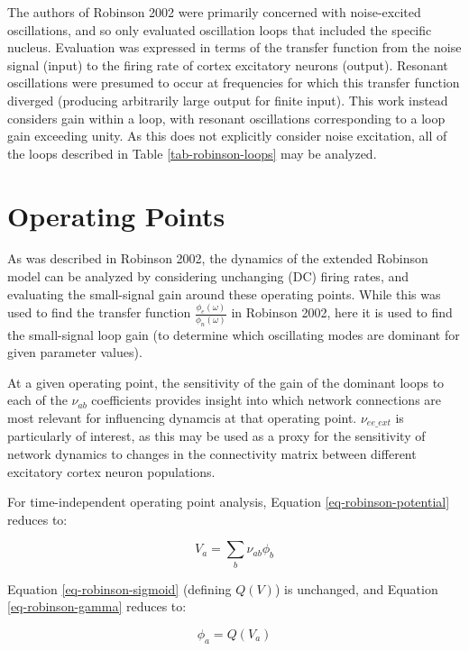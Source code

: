 The authors of Robinson 2002 were primarily concerned with noise-excited
oscillations, and so only evaluated oscillation loops that included the
specific nucleus. Evaluation was expressed in terms of the transfer
function from the noise signal (input) to the firing rate of cortex
excitatory neurons (output). Resonant oscillations were presumed to occur
at frequencies for which this transfer function diverged (producing
arbitrarily large output for finite input). This work instead considers
gain within a loop, with resonant oscillations corresponding to a loop
gain exceeding unity. As this does not explicitly consider noise excitation,
all of the loops described in Table \ref{tab-robinson-loops} may be
analyzed.

%
%
\section{Operating Points}
\label{sect-robinson-math-dc}

As was described in Robinson 2002, the dynamics of the extended Robinson
model can be analyzed by considering unchanging (DC) firing rates, and
evaluating the small-signal gain around these operating points. While this
was used to find the transfer function
$\frac{\phi_e(\omega)}{\phi_n(\omega)}$ in Robinson 2002, here it is used
to find the small-signal loop gain (to determine which oscillating modes
are dominant for given parameter values).

At a given operating point, the sensitivity of the gain of the dominant
loops to each of the $\nu_{ab}$ coefficients provides insight into which
network connections are most relevant for influencing dynamcis at that
operating point. $\nu_{ee\_ext}$ is particularly of interest, as this
may be used as a proxy for the sensitivity of network dynamics to changes
in the connectivity matrix between different excitatory cortex neuron
populations.

For time-independent operating point analysis, Equation
\ref{eq-robinson-potential} reduces to:

\begin{equation}
V_a = \sum_b \nu_{ab} \phi_b
\label{eq-robinson-dc-potential}
\end{equation}

Equation \ref{eq-robinson-sigmoid} (defining $Q(V)$) is unchanged, and
Equation \ref{eq-robinson-gamma} reduces to:

\begin{equation}
\phi_a = Q(V_a)
\label{eq-robinson-dc-nogamma}
\end{equation}

